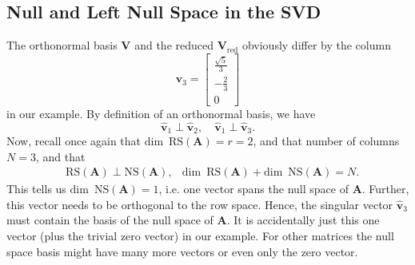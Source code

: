 \documentclass[a4paper, 11pt]{scrartcl}
\begin{document}
\subsection{Null and Left Null Space in the SVD}
The orthonormal basis $\bm{V}$ and the reduced $\bm{V}_\text{red}$ obviously differ by the column
$$
\hat{\bm{v}}_3 =
\begin{bmatrix}
\frac{\sqrt{5}}{3}\\
-\frac{2}{3} \\
0
\end{bmatrix}
$$
in our example. By definition of an orthonormal basis, we have
$$
\hat{\bm{v}}_1 \perp \hat{\bm{v}}_2,\quad
\hat{\bm{v}}_1 \perp \hat{\bm{v}}_3.
$$
Now, recall once again that $\text{dim}\,\,\, \text{RS}(\bm{A}) = r = 2$, and that number of columns $N=3$, and that
\begin{align*}
&\text{RS}(\bm{A}) \perp
\text{NS}(\bm{A}),
&\text{dim}\,\,\, \text{RS}(\bm{A}) + \text{dim}\,\,\, \text{NS}(\bm{A}) = N.
\end{align*}
This tells us $\text{dim}\,\,\, \text{NS}(\bm{A}) = 1$, i.e. one vector spans the null space of $\bm{A}$. Further, this vector needs to be orthogonal to the row space.
%
Hence, the singular vector $\hat{\bm{v}}_3$ must contain the basis of the null space of $\bm{A}$. It is accidentally just this one vector (plus the trivial zero vector) in our example. For other matrices the null space basis might have many more vectors or even only the zero vector.
\end{document}
